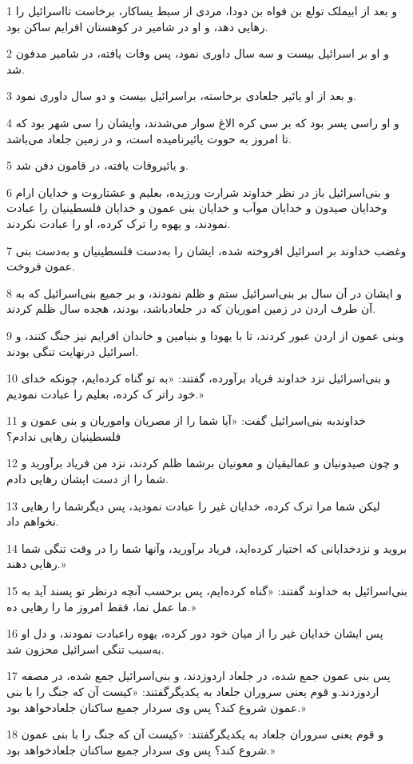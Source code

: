 \par 1 و بعد از ابیملک تولع بن فواه بن دودا، مردی از سبط یساکار، برخاست تااسرائیل را رهایی دهد، و او در شامیر در کوهستان افرایم ساکن بود.
\par 2 و او بر اسرائیل بیست و سه سال داوری نمود، پس وفات یافته، در شامیر مدفون شد.
\par 3 و بعد از او یائیر جلعادی برخاسته، براسرائیل بیست و دو سال داوری نمود.
\par 4 و او راسی پسر بود که بر سی کره الاغ سوار می‌شدند، وایشان را سی شهر بود که تا امروز به حووت یائیرنامیده است، و در زمین جلعاد می‌باشد.
\par 5 و یائیروفات یافته، در قامون دفن شد.
\par 6 و بنی‌اسرائیل باز در نظر خداوند شرارت ورزیده، بعلیم و عشتاروت و خدایان ارام وخدایان صیدون و خدایان موآب و خدایان بنی عمون و خدایان فلسطینیان را عبادت نمودند، و یهوه را ترک کرده، او را عبادت نکردند.
\par 7 وغضب خداوند بر اسرائیل افروخته شده، ایشان را به‌دست فلسطینیان و به‌دست بنی عمون فروخت.
\par 8 و ایشان در آن سال بر بنی‌اسرائیل ستم و ظلم نمودند، و بر جمیع بنی‌اسرائیل که به آن طرف اردن در زمین اموریان که در جلعادباشد، بودند، هجده سال ظلم کردند.
\par 9 وبنی عمون از اردن عبور کردند، تا با یهودا و بنیامین و خاندان افرایم نیز جنگ کنند، و اسرائیل درنهایت تنگی بودند.
\par 10 و بنی‌اسرائیل نزد خداوند فریاد برآورده، گفتند: «به تو گناه کرده‌ایم، چونکه خدای خود راتر ک کرده، بعلیم را عبادت نمودیم.» 
\par 11 خداوندبه بنی‌اسرائیل گفت: «آیا شما را از مصریان واموریان و بنی عمون و فلسطینیان رهایی ندادم؟
\par 12 و چون صیدونیان و عمالیقیان و معونیان برشما ظلم کردند، نزد من فریاد برآورید و شما را از دست ایشان رهایی دادم.
\par 13 لیکن شما مرا ترک کرده، خدایان غیر را عبادت نمودید، پس دیگرشما را رهایی نخواهم داد.
\par 14 بروید و نزدخدایانی که اختیار کرده‌اید، فریاد برآورید، وآنها شما را در وقت تنگی شما رهایی دهند.»
\par 15 بنی‌اسرائیل به خداوند گفتند: «گناه کرده‌ایم، پس برحسب آنچه درنظر تو پسند آید به ما عمل نما، فقط امروز ما را رهایی ده.»
\par 16 پس ایشان خدایان غیر را از میان خود دور کرده، یهوه راعبادت نمودند، و دل او به‌سبب تنگی اسرائیل محزون شد.
\par 17 پس بنی عمون جمع شده، در جلعاد اردوزدند، و بنی‌اسرائیل جمع شده، در مصفه اردوزدند.و قوم یعنی سروران جلعاد به یکدیگرگفتند: «کیست آن که جنگ را با بنی عمون شروع کند؟ پس وی سردار جمیع ساکنان جلعادخواهد بود.»
\par 18 و قوم یعنی سروران جلعاد به یکدیگرگفتند: «کیست آن که جنگ را با بنی عمون شروع کند؟ پس وی سردار جمیع ساکنان جلعادخواهد بود.»
 
